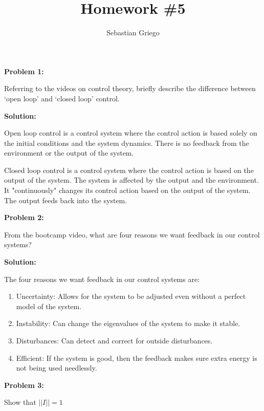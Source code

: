 \documentclass[12pt]{article}
\newenvironment{problem}[1]{
    \textbf{Problem #1:}
}{
    \rmfamily \vspace{1em}
}
\newenvironment{solution}{
    \textbf{Solution:}
    
}{
    
    \vspace{2em}
}
\begin{document}
\title{Homework \#5}  %
\author{Sebastian Griego}  %
\maketitle

\begin{problem}{1}
    Referring to the videos on control theory, briefly describe the difference between ‘open loop’ and ‘closed loop’ control.
\end{problem}

\begin{solution}
    Open loop control is a control system where the control action is based solely on the initial conditions and the system dynamics. There is no feedback from the environment or the output of the system.

    Closed loop control is a control system where the control action is based on the output of the system. The system is affected by the output and the environment. It "continuously" changes its control action based on the output of the system. The output feeds back into the system.
\end{solution}

\newpage

\begin{problem}{2}
    From the bootcamp video, what are four reasons we want feedback in our control systems?
\end{problem}

\begin{solution}
    The four reasons we want feedback in our control systems are:
    \begin{enumerate}
        \item Uncertainty: Allows for the system to be adjusted even without a perfect model of the system.
        \item Instability: Can change the eigenvalues of the system to make it stable.
        \item Disturbances: Can detect and correct for outside disturbances.
        \item Efficient: If the system is good, then the feedback makes sure extra energy is not being used needlessly.
    \end{enumerate}
\end{solution}

\newpage

\begin{problem}{3}
    Show that \(||I|| = 1\)
\end{problem}
\end{document}
